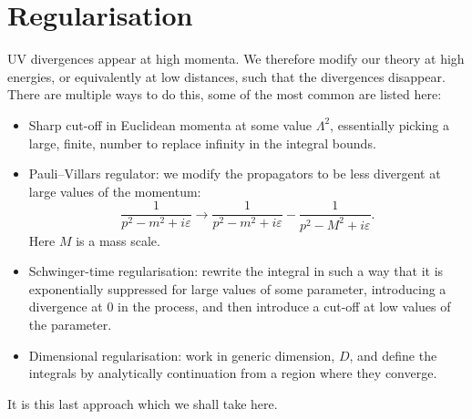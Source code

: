 \documentclass[fleqn]{NotesClass}
\begin{document}
    \section{Regularisation}
    UV divergences appear at high momenta.
    We therefore modify our theory at high energies, or equivalently at low distances, such that the divergences disappear.
    There are multiple ways to do this, some of the most common are listed here:
    \begin{itemize}
        \item Sharp cut-off in Euclidean momenta at some value \(\Lambda^2\), essentially picking a large, finite, number to replace infinity in the integral bounds.
        \item Pauli--Villars regulator: we modify the propagators to be less divergent at large values of the momentum:
        \begin{equation}
            \frac{1}{p^2 - m^2 + i\varepsilon} \to \frac{1}{p^2 - m^2 + i\varepsilon} - \frac{1}{p^2 - M^2 + i\varepsilon}.
        \end{equation}
        Here \(M\) is a mass scale.
        \item Schwinger-time regularisation: rewrite the integral in such a way that it is exponentially suppressed for large values of some parameter, introducing a divergence at 0 in the process, and then introduce a cut-off at low values of the parameter.
        \item Dimensional regularisation: work in generic dimension, \(D\), and define the integrals by analytically continuation from a region where they converge.
    \end{itemize}
    It is this last approach which we shall take here.
    
\end{document}
